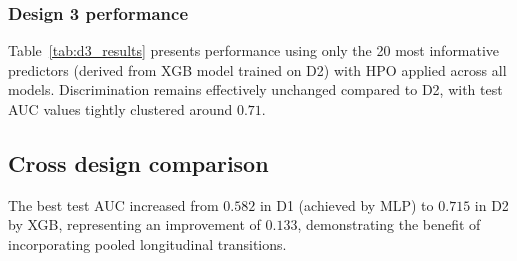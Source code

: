 \begin{table}[ht]
\centering
\caption{Predictive performance across model families for D2 (multi-wave design).}\label{tab:d2_results}
\end{table}

\subsubsection{Design 3 performance}\label{ssc:d3}
Table~\ref{tab:d3_results} presents performance using only the 20 most informative predictors (derived from \gls{XGB} model trained on D2) with \gls{HPO} applied across all models. Discrimination remains effectively unchanged compared to D2, with test \gls{AUC} values tightly clustered around $0.71$.
\begin{table}[ht]
\centering
\caption{Predictive performance across model families for D3 (tuned design).}\label{tab:d3_results}
\end{table}

\subsection{Cross design comparison}
The best test \gls{AUC} increased from $0.582$ in D1 (achieved by \gls{MLP}) to $0.715$ in D2 by \gls{XGB}, representing an improvement of $0.133$, demonstrating the benefit of incorporating pooled longitudinal transitions.


